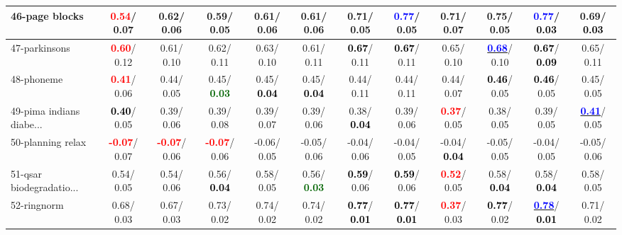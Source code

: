 \begin{table}[h]
\begin{center}
{\begin{tabular}{lc|c|c|c|c|c|c|c|c|c|c}
46-page blocks & \textcolor{red}{\textbf{  0.54}}/  0.07 &   0.62/  0.06 &   0.59/  0.05 &   0.61/  0.06 &   0.61/  0.06 &   0.71/  0.05 & \textcolor{blue}{\textbf{  0.77}}/  0.05 &   0.71/  0.07 &   0.75/  0.05 & \textcolor{blue}{\textbf{  0.77}}/\textcolor{black}{\textbf{  0.03}} &   0.69/\textcolor{black}{\textbf{  0.03}} \\ \hline
47-parkinsons & \textcolor{red}{\textbf{  0.60}}/  0.12 &   0.61/  0.10 &   0.62/  0.11 &   0.63/  0.10 &   0.61/  0.11 & \textcolor{black}{\textbf{  0.67}}/  0.11 & \textcolor{black}{\textbf{  0.67}}/  0.11 &   0.65/  0.10 & \underline{\textcolor{blue}{\textbf{  0.68}}}/  0.10 & \textcolor{black}{\textbf{  0.67}}/\textcolor{black}{\textbf{  0.09}} &   0.65/  0.11 \\
48-phoneme & \textcolor{red}{\textbf{  0.41}}/  0.06 &   0.44/  0.05 &   0.45/\textcolor{darkgreen}{\textbf{  0.03}} &   0.45/\textcolor{black}{\textbf{  0.04}} &   0.45/\textcolor{black}{\textbf{  0.04}} &   0.44/  0.11 &   0.44/  0.11 &   0.44/  0.07 & \textcolor{black}{\textbf{  0.46}}/  0.05 & \textcolor{black}{\textbf{  0.46}}/  0.05 &   0.45/  0.05 \\
49-pima indians diabe... & \textcolor{black}{\textbf{  0.40}}/  0.05 &   0.39/  0.06 &   0.39/  0.08 &   0.39/  0.07 &   0.39/  0.06 &   0.38/\textcolor{black}{\textbf{  0.04}} &   0.39/  0.06 & \textcolor{red}{\textbf{  0.37}}/  0.05 &   0.38/  0.05 &   0.39/  0.05 & \underline{\textcolor{blue}{\textbf{  0.41}}}/  0.05 \\
50-planning relax & \textcolor{red}{\textbf{ -0.07}}/  0.07 & \textcolor{red}{\textbf{ -0.07}}/  0.06 & \textcolor{red}{\textbf{ -0.07}}/  0.06 &  -0.06/  0.05 &  -0.05/  0.06 &  -0.04/  0.06 &  -0.04/  0.05 &  -0.04/\textcolor{black}{\textbf{  0.04}} &  -0.05/  0.05 &  -0.04/  0.05 &  -0.05/  0.06 \\
51-qsar biodegradatio... &   0.54/  0.05 &   0.54/  0.06 &   0.56/\textcolor{black}{\textbf{  0.04}} &   0.58/  0.05 &   0.56/\textcolor{darkgreen}{\textbf{  0.03}} & \textcolor{black}{\textbf{  0.59}}/  0.06 & \textcolor{black}{\textbf{  0.59}}/  0.06 & \textcolor{red}{\textbf{  0.52}}/  0.05 &   0.58/\textcolor{black}{\textbf{  0.04}} &   0.58/\textcolor{black}{\textbf{  0.04}} &   0.58/  0.05 \\
52-ringnorm &   0.68/  0.03 &   0.67/  0.03 &   0.73/  0.02 &   0.74/  0.02 &   0.74/  0.02 & \textcolor{black}{\textbf{  0.77}}/\textcolor{black}{\textbf{  0.01}} & \textcolor{black}{\textbf{  0.77}}/\textcolor{black}{\textbf{  0.01}} & \textcolor{red}{\textbf{  0.37}}/  0.03 & \textcolor{black}{\textbf{  0.77}}/  0.02 & \underline{\textcolor{blue}{\textbf{  0.78}}}/\textcolor{black}{\textbf{  0.01}} &   0.71/  0.02 \\

\end{tabular}}
\end{center}
\end{table}
